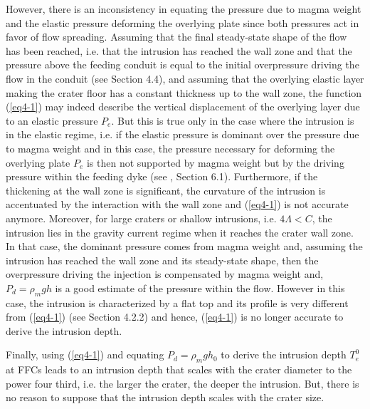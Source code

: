 \begin{article}
        However, there  is an  inconsistency in equating  the pressure
        due to  magma weight  and the  elastic pressure  deforming the
        overlying  plate since  both pressures  act in  favor of  flow
        spreading. Assuming  that the final steady-state  shape of the
        flow has been reached, i.e. that the intrusion has reached the
        wall zone and  that the pressure above the  feeding conduit is
        equal  to the  initial overpressure  driving the  flow in  the
        conduit  (see Section  4.4), and  assuming that  the overlying
        elastic layer making the crater floor has a constant thickness
        up to  the wall  zone, the  function (\ref{eq4-1})  may indeed
        describe the vertical displacement  of the overlying layer due
        to an elastic  pressure $P_{e}$. But this is true  only in the
        case where the intrusion is in the elastic regime, i.e. if the
        elastic pressure  is dominant over  the pressure due  to magma
        weight and in this case,  the pressure necessary for deforming
        the overlying  plate $P_{e}$  is then  not supported  by magma
        weight but  by the  driving pressure  within the  feeding dyke
        (see  \citep{Michaut2011}, Section  6.1). Furthermore,  if the
        thickening at the  wall zone is significant,  the curvature of
        the intrusion is accentuated by  the interaction with the wall
        zone and (\ref{eq4-1}) is  not accurate anymore. Moreover, for
        large craters  or shallow intrusions, i.e.  $4\Lambda <C$, the
        intrusion lies in  the gravity current regime  when it reaches
        the  crater wall  zone. In  that case,  the dominant  pressure
        comes  from  magma  weight  and, assuming  the  intrusion  has
        reached the  wall zone  and its  steady-state shape,  then the
        overpressure  driving the  injection is  compensated by  magma
        weight  and,  $P_{d}=\rho_{m}gh$ is  a  good  estimate of  the
        pressure within the flow. However  in this case, the intrusion
        is  characterized  by a  flat  top  and  its profile  is  very
        different    from    (\ref{eq4-1})   (see    Section    4.2.2)
        \citep{Bunger2011,Michaut2011} and hence,  (\ref{eq4-1}) is no
        longer accurate to derive the intrusion depth.
		
        Finally, using  (\ref{eq4-1}) and equating $P_d=\rho_m  g h_0$
        to  derive the  intrusion depth  $T_e^0$ at  FFCs leads  to an
        intrusion depth  that scales with  the crater diameter  to the
        power four third,  i.e. the larger the crater,  the deeper the
        intrusion.  But,  there  is  no reason  to  suppose  that  the
        intrusion depth scales with the crater size.
		

\end{article}
